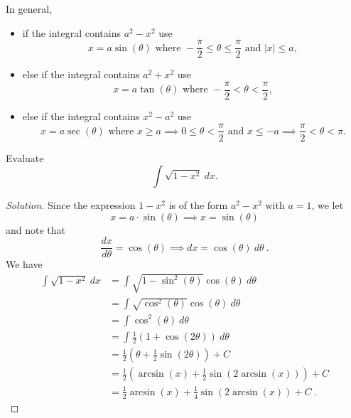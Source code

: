 \documentclass[compacto,10pt,comentarios]{aleph-notas}
\begin{document}
In general,
\begin{itemize}
    \item if the integral contains $a^2 - x^2$ use
    $$
        x = a\sin(\theta) \text{ where } -\frac{\pi}{2} \leq \theta \leq \frac{\pi}{2} \text{ and } |x| \leq a,
    $$
    \item else if the integral contains $a^2 + x^2$ use
    $$
        x = a\tan(\theta) \text{ where } -\frac{\pi}{2} < \theta < \frac{\pi}{2},
    $$
    \item else if the integral contains $x^2 - a^2$ use
    $$
        x = a\sec(\theta) \text{ where } x \geq a \implies 0 \leq \theta < \frac{\pi}{2} \text{ and } x \leq -a \implies \frac{\pi}{2} < \theta < \pi .
    $$
\end{itemize}

\begin{ejer}
    Evaluate 
    $$
        \int \sqrt{1 - x^{2}}~dx.
    $$
\end{ejer}
\begin{proof}[Solution]
    Since the expression $1 - x^{2}$ is of the form $a^{2} - x^{2}$ with $a = 1$, we let
    $$
        x = a \cdot \sin(\theta) \implies x = \sin(\theta)
    $$
    and note that
    $$
        \frac{dx}{d\theta} = \cos(\theta) \implies dx = \cos(\theta) ~ d\theta  ~.
    $$
    We have
    \begin{align*}
        \int \sqrt{1 - x^{2}}~dx
        & = \int \sqrt{1 - \sin^{2}(\theta)} \cos(\theta) ~ d\theta \\
        & = \int \sqrt{\cos^{2}(\theta)} \cos(\theta) ~ d\theta \\
        & = \int \cos^{2}(\theta) ~ d\theta \\
        & = \int \frac{1}{2} \left( 1 + \cos(2\theta) \right) ~ d\theta \\
        & = \frac{1}{2} \left( \theta + \frac{1}{2} \sin(2\theta) \right) + C \\
        & = \frac{1}{2} \left( \arcsin(x) + \frac{1}{2} \sin(2\arcsin(x)) \right) + C \\
        & = \frac{1}{2} \arcsin(x) + \frac{1}{4} \sin(2\arcsin(x)) + C ~.
    \end{align*}
\end{proof}
\end{document}
